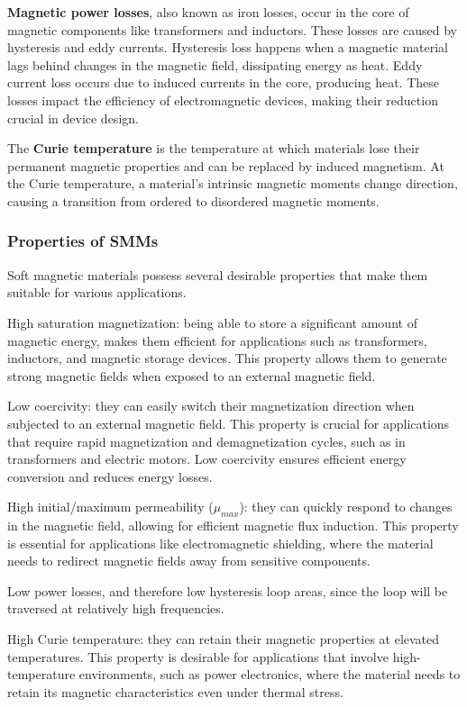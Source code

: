 \textbf{Magnetic power losses}, also known as iron losses, occur in the core of magnetic components like transformers and inductors. These losses are caused by hysteresis and eddy currents. Hysteresis loss happens when a magnetic material lags behind changes in the magnetic field, dissipating energy as heat. Eddy current loss occurs due to induced currents in the core, producing heat. These losses impact the efficiency of electromagnetic devices, making their reduction crucial in device design.

The \textbf{Curie temperature} is the temperature at which materials lose their permanent magnetic properties and can be replaced by induced magnetism. At the Curie temperature, a material's intrinsic magnetic moments change direction, causing a transition from ordered to disordered magnetic moments.

\subsubsection{Properties of SMMs}

Soft magnetic materials possess several desirable properties that make them suitable for various applications.

High saturation magnetization: being able to store a significant amount of magnetic energy, makes them efficient for applications such as transformers, inductors, and magnetic storage devices. This property allows them to generate strong magnetic fields when exposed to an external magnetic field.

Low coercivity: they can easily switch their magnetization direction when subjected to an external magnetic field. This property is crucial for applications that require rapid magnetization and demagnetization cycles, such as in transformers and electric motors. Low coercivity ensures efficient energy conversion and reduces energy losses.

High initial/maximum permeability ($\mu_{max}$): they can quickly respond to changes in the magnetic field, allowing for efficient magnetic flux induction. This property is essential for applications like electromagnetic shielding, where the material needs to redirect magnetic fields away from sensitive components.

Low power losses, and therefore low hysteresis loop areas, since the loop will be traversed at relatively high frequencies.

High Curie temperature: they can retain their magnetic properties at elevated temperatures. This property is desirable for applications that involve high-temperature environments, such as power electronics, where the material needs to retain its magnetic characteristics even under thermal stress.

